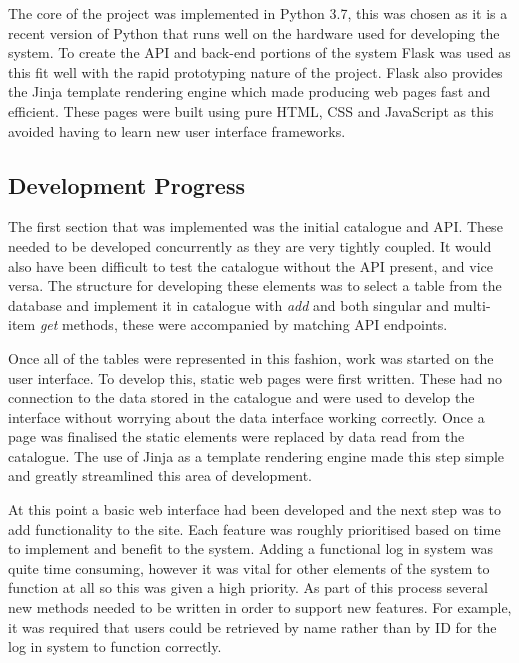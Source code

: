 \documentclass[12pt,titlepage]{article}
\begin{document}
  The core of the project was implemented in Python 3.7, this was chosen as it
  is a recent version of Python that runs well on the hardware used for
  developing the system. To create the API and back-end portions of the system
  Flask was used as this fit well with the rapid prototyping nature of the
  project. Flask also provides the Jinja template rendering engine which made
  producing web pages fast and efficient. These pages were built using pure
  HTML, CSS and JavaScript as this avoided having to learn new user interface
  frameworks.

  \subsection{Development Progress}

  The first section that was implemented was the initial catalogue and API.
  These needed to be developed concurrently as they are very tightly coupled. It
  would also have been difficult to test the catalogue without the API present,
  and vice versa. The structure for developing these elements was to select a
  table from the database and implement it in catalogue with \textit{add} and
  both singular and multi-item \textit{get} methods, these were accompanied by
  matching API endpoints.

  Once all of the tables were represented in this fashion, work was started on
  the user interface. To develop this, static web pages were first written.
  These had no connection to the data stored in the catalogue and were used to
  develop the interface without worrying about the data interface working
  correctly. Once a page was finalised the static elements were replaced by data
  read from the catalogue. The use of Jinja as a template rendering engine made
  this step simple and greatly streamlined this area of development.

  At this point a basic web interface had been developed and the next step was
  to add functionality to the site. Each feature was roughly prioritised based
  on time to implement and benefit to the system. Adding a functional log in
  system was quite time consuming, however it was vital for other elements of
  the system to function at all so this was given a high priority. As part of
  this process several new methods needed to be written in order to support new
  features. For example, it was required that users could be retrieved by name
  rather than by ID for the log in system to function correctly.
\end{document}
